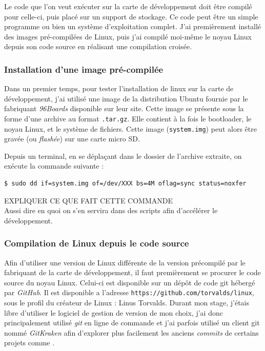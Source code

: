 Le code que l'on veut exécuter sur la carte de développement doit être compilé pour celle-ci, puis placé sur un support de stockage. Ce code peut être un simple programme ou bien un système d'exploitation complet. J'ai premièrement installé des images pré-compilées de Linux, puis j'ai compilé moi-même le noyau Linux depuis son code source en réalisant une compilation croisée.

\subsubsection{Installation d'une image pré-compilée}

Dans un premier temps, pour tester l'installation de linux sur la carte de développement, j'ai utilisé une image de la distribution Ubuntu fournie par le fabriquant \textit{96Boards} disponible sur leur site. Cette image se présente sous la forme d'une archive au format \texttt{.tar.gz}. Elle contient à la fois le \gls{bootloader}, le noyau Linux, et le système de fichiers. Cette image (\texttt{system.img}) peut alors être gravée (ou \textit{flashée}) sur une carte micro SD. 

Depuis un terminal, en se déplaçant dans le dossier de l'archive extraite, on exécute la commande suivante : 
\begin{lstlisting}[style=command]
$ sudo dd if=system.img of=/dev/XXX bs=4M oflag=sync status=noxfer
\end{lstlisting}

\begin{center}
    \color{red}
    EXPLIQUER CE QUE FAIT CETTE COMMANDE \\
    Aussi dire en quoi on s'en servira dans des scripts afin d'accélérer le développement.
\end{center}


\subsubsection{Compilation de Linux depuis le code source}\label{sec:compilation-linux-source}

Afin d'utiliser une version de Linux différente de la version précompilé par le fabriquant de la carte de développement, il faut premièrement se procurer le code source du noyau Linux. Celui-ci est disponible sur un dépôt de code \gls{git} hébergé par \textit{GitHub}. Il est disponible a l'adresse \texttt{https://github.com/torvalds/linux}, sous le profil du créateur de Linux : Linus Torvalds. Durant mon stage, j'étais libre d'utiliser le logiciel de gestion de version de mon choix, j'ai donc principalement utilisé \textit{git} en ligne de commande et j'ai parfois utilisé un client git nommé \textit{GitKraken} afin d'explorer plus facilement les anciens \textit{commits} de certains projets comme \litmus.

